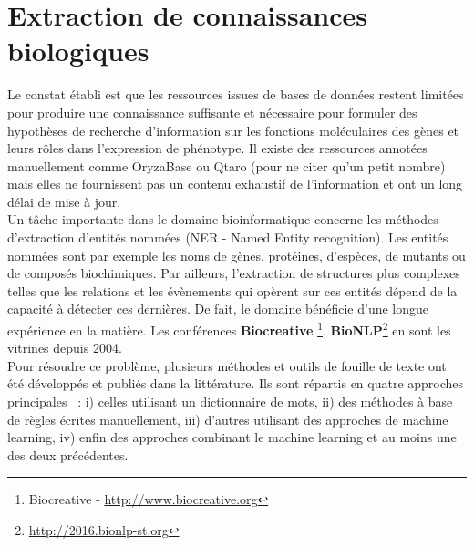 \section{Extraction de connaissances biologiques}

Le constat établi est que les ressources issues de bases de données restent limitées pour produire une connaissance suffisante et nécessaire pour formuler des hypothèses de recherche d’information sur les fonctions moléculaires des gènes et leurs rôles dans l’expression de phénotype. Il existe des ressources annotées manuellement comme OryzaBase ou Qtaro (pour ne citer qu'un petit nombre) mais elles ne fournissent pas un contenu exhaustif de l'information et ont un long délai de mise à jour. \\


Un tâche importante dans le domaine bioinformatique concerne les méthodes d'extraction d'entités nommées (NER - Named Entity recognition). Les entités nommées sont par exemple les noms de gènes, protéines, d'espèces, de mutants ou de composés biochimiques. Par ailleurs, l'extraction de structures plus complexes telles que les relations  et les évènements qui opèrent sur ces entités dépend de la capacité à détecter ces dernières. De fait, le domaine bénéficie d'une longue expérience en la matière.  Les conférences  \textbf{Biocreative} \footnote{Biocreative - \url{http://www.biocreative.org}}, \textbf{BioNLP}\footnote{\url{http://2016.bionlp-st.org}} en sont les vitrines depuis 2004.\\

 Pour résoudre ce problème, plusieurs méthodes et outils de fouille de texte ont été développés et publiés dans la littérature. Ils sont répartis en quatre approches principales~\cite{Basaldella2017} : i)  celles utilisant un dictionnaire de mots, ii)  des méthodes à base de règles écrites manuellement, iii) d'autres utilisant des approches de machine learning, iv) enfin des approches combinant le machine learning et au moins une des deux précédentes.\\

